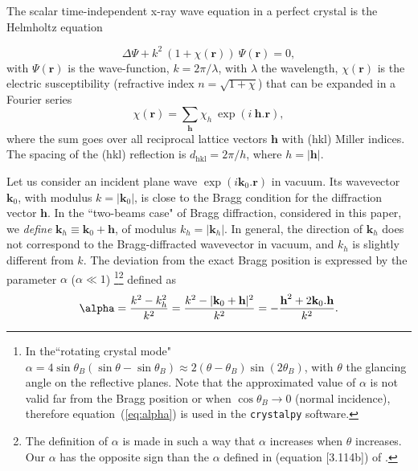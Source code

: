\documentclass{iucr}
\begin{document}
The scalar time-independent x-ray wave equation in a perfect crystal is the Helmholtz equation

\begin{equation}
\label{eq:helmholz}
    \Delta \Psi + k^2~(1+\chi(\textbf{r})) ~\Psi(\textbf{r}) = 0,
\end{equation}
with $\Psi(\textbf{r})$ is the wave-function, $k=2\pi/\lambda$, with $\lambda$ the wavelength, $\chi(\textbf{r})$ is the electric susceptibility (refractive index $n=\sqrt{1+\chi}$)
that can be expanded in a Fourier series
\begin{equation}
\label{eq:chi}
    \chi(\textbf{r}) = \sum_{\textbf{h}} \chi_h ~\exp(i~\textbf{h} . \textbf{r}),
\end{equation}
where 
the sum goes over all reciprocal lattice vectors $\textbf{h}$ with (hkl) Miller indices. 
The spacing of the (hkl) reflection is $d_\text{hkl}=2 \pi/h$, where $h=|\textbf{h}|$.

Let us consider an incident plane wave $\exp(i\textbf{k}_0 . \textbf{r})$ in vacuum. Its wavevector $\textbf{k}_0$, with modulus $k=|\textbf{k}_0|$, is close to the Bragg condition for the diffraction vector $\textbf{h}$.
In the ``two-beams case" of Bragg diffraction, considered in this paper, we \textit{define} $\textbf{k}_h \equiv \textbf{k}_0+\textbf{h}$, of modulus  $k_h=|\textbf{k}_h|$.
In general, the direction of $\textbf{k}_h$ does not correspond to the Bragg-diffracted wavevector in vacuum, and $k_h$ is slightly different from $k$.
The deviation from the exact Bragg position is expressed by the parameter $\alpha$ ($\alpha \ll 1$)
 \footnote{In the``rotating crystal mode" $\alpha=4 \sin \theta_B (\sin \theta - \sin \theta_B) \approx 2 (\theta-\theta_B) \sin (2\theta_B)$, with $\theta$ the glancing angle on the reflective planes. Note that the approximated value of $\alpha$ is not valid far from the Bragg position or when $\cos\theta_B \rightarrow 0$ (normal incidence), therefore  equation~(\ref{eq:alpha}) is used in the {\tt crystalpy} software. }\footnote{
 The definition of $\alpha$ is made in such a way that $\alpha$ increases when $\theta$ increases. Our $\alpha$ has the opposite sign than the $\alpha$ defined in (equation [3.114b]) of \cite{ZachariasenBook}. 
 } defined as
\begin{equation}
\label{eq:alpha}
\alpha = \frac{k^2-k_h^2}{k^2} = \frac{k^2-|\textbf k_0 + \textbf h|^2}{k^2} = - \frac{\textbf h^2 + 2 \textbf k_0 . \textbf h}{k^2}.
\end{equation}
\end{document}
